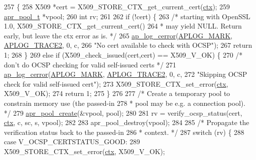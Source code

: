 \begin{DoxyCode}
257 \{
258     X509 *cert = X509\_STORE\_CTX\_get\_current\_cert(\hyperlink{group__APACHE__CORE__FILTER_ga94af791485570bea922969fef12d6259}{ctx});
259     \hyperlink{structapr__pool__t}{apr\_pool\_t} *vpool;
260     \textcolor{keywordtype}{int} rv;
261 
262     \textcolor{keywordflow}{if} (!cert) \{
263         \textcolor{comment}{/* starting with OpenSSL 1.0, X509\_STORE\_CTX\_get\_current\_cert()}
264 \textcolor{comment}{         * may yield NULL. Return early, but leave the ctx error as is. */}
265         \hyperlink{group__APACHE__CORE__LOG_ga60ef6919b8e1b691b0c1ac4d67c9449f}{ap\_log\_cerror}(\hyperlink{group__APACHE__CORE__LOG_ga655e126996849bcb82e4e5a14c616f4a}{APLOG\_MARK}, \hyperlink{group__APACHE__CORE__LOG_gaaa69603638ba4a5d83b8727a1ca5b76a}{APLOG\_TRACE2}, 0, c,
266                       \textcolor{stringliteral}{"No cert available to check with OCSP"});
267         \textcolor{keywordflow}{return} 1;
268     \}
269     \textcolor{keywordflow}{else} \textcolor{keywordflow}{if} (X509\_check\_issued(cert,cert) == X509\_V\_OK) \{
270         \textcolor{comment}{/* don't do OCSP checking for valid self-issued certs */}
271         \hyperlink{group__APACHE__CORE__LOG_ga60ef6919b8e1b691b0c1ac4d67c9449f}{ap\_log\_cerror}(\hyperlink{group__APACHE__CORE__LOG_ga655e126996849bcb82e4e5a14c616f4a}{APLOG\_MARK}, \hyperlink{group__APACHE__CORE__LOG_gaaa69603638ba4a5d83b8727a1ca5b76a}{APLOG\_TRACE2}, 0, c,
272                       \textcolor{stringliteral}{"Skipping OCSP check for valid self-issued cert"});
273         X509\_STORE\_CTX\_set\_error(\hyperlink{group__APACHE__CORE__FILTER_ga94af791485570bea922969fef12d6259}{ctx}, X509\_V\_OK);
274         \textcolor{keywordflow}{return} 1;
275     \}
276 
277     \textcolor{comment}{/* Create a temporary pool to constrain memory use (the passed-in}
278 \textcolor{comment}{     * pool may be e.g. a connection pool). */}
279     \hyperlink{group__apr__pools_gaa7c40921aae156b665e82b0a66991a39}{apr\_pool\_create}(&vpool, pool);
280 
281     rv = verify\_ocsp\_status(cert, \hyperlink{group__APACHE__CORE__FILTER_ga94af791485570bea922969fef12d6259}{ctx}, c, sc, s, vpool);
282 
283     apr\_pool\_destroy(vpool);
284 
285     \textcolor{comment}{/* Propagate the verification status back to the passed-in}
286 \textcolor{comment}{     * context. */}
287     \textcolor{keywordflow}{switch} (rv) \{
288     \textcolor{keywordflow}{case} V\_OCSP\_CERTSTATUS\_GOOD:
289         X509\_STORE\_CTX\_set\_error(\hyperlink{group__APACHE__CORE__FILTER_ga94af791485570bea922969fef12d6259}{ctx}, X509\_V\_OK);

\end{DoxyCode}

